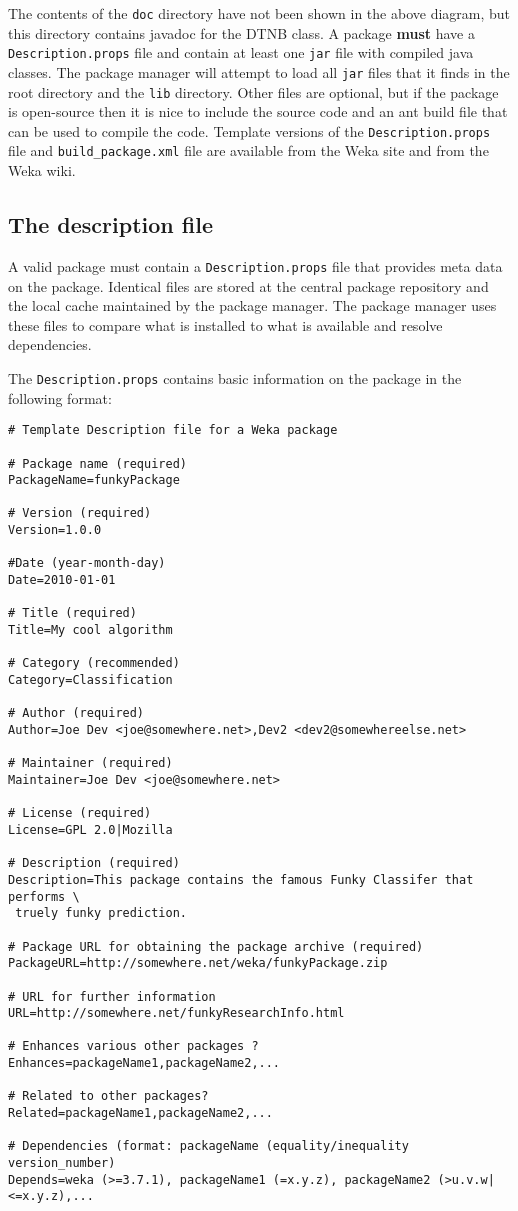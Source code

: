 The contents of the \texttt{doc} directory have not been shown in the
above diagram, but this directory contains javadoc for the DTNB
class. A package \textbf{must} have a \texttt{Description.props} file
and contain at least one \texttt{jar} file with compiled java classes.
The package manager will attempt to load all \texttt{jar} files that
it finds in the root directory and the \texttt{lib} directory. Other
files are optional, but if the package is open-source then it is nice
to include the source code and an ant build file that can be used to
compile the code. Template versions of the \texttt{Description.props}
file and \verb=build_package.xml= file are available from the Weka
site and from the Weka wiki.

\subsection{The description file}

A valid package must contain a \texttt{Description.props} file that
provides meta data on the package. Identical files are stored at the
central package repository and the local cache maintained by the
package manager. The package manager uses these files to compare
what is installed to what is available and resolve dependencies.

The \texttt{Description.props} contains basic information on the
package in the following format:

{\scriptsize
\begin{verbatim}
# Template Description file for a Weka package

# Package name (required)
PackageName=funkyPackage

# Version (required)
Version=1.0.0

#Date (year-month-day)
Date=2010-01-01

# Title (required)
Title=My cool algorithm

# Category (recommended)
Category=Classification

# Author (required)
Author=Joe Dev <joe@somewhere.net>,Dev2 <dev2@somewhereelse.net>

# Maintainer (required)
Maintainer=Joe Dev <joe@somewhere.net>

# License (required)
License=GPL 2.0|Mozilla

# Description (required)
Description=This package contains the famous Funky Classifer that performs \
 truely funky prediction.

# Package URL for obtaining the package archive (required)
PackageURL=http://somewhere.net/weka/funkyPackage.zip

# URL for further information
URL=http://somewhere.net/funkyResearchInfo.html

# Enhances various other packages ?
Enhances=packageName1,packageName2,...

# Related to other packages?
Related=packageName1,packageName2,...

# Dependencies (format: packageName (equality/inequality version_number)
Depends=weka (>=3.7.1), packageName1 (=x.y.z), packageName2 (>u.v.w|<=x.y.z),...
\end{verbatim}}


